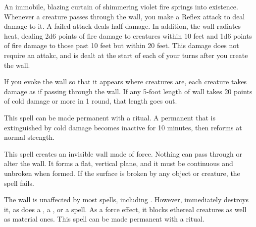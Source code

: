 \spellrng{\rngmed}
\spelldur{\durshort}
\begin{spelleffect}
  An immobile, blazing curtain of shimmering violet fire springs into existence. Whenever a creature passes through the wall, you make a Reflex attack to deal damage to it. A failed attack deals half damage. In addition, the wall radiates heat, dealing 2d6 points of fire damage to creatures within 10 feet and 1d6 points of fire damage to those past 10 feet but within 20 feet. This damage does not require an attakc, and is dealt at the start of each of your turns after you create the wall.
  \par If you evoke the wall so that it appears where creatures are, each creature takes damage as if passing through the wall. If any 5-foot length of wall takes 20 points of cold damage or more in 1 round, that length goes out.
\end{spelleffect}
\begin{spellnotes}
This spell can be made permanent with a  ritual. A permanent  that is extinguished by cold damage becomes inactive for 10 minutes, then reforms at normal strength.
\end{spellnotes}

\spellrng{\rngmed}
\begin{spelleffect}
  This spell creates an invisible wall made of force. Nothing can pass through or alter the wall. It forms a flat, vertical plane, and it must be continuous and unbroken when formed. If the surface is broken by any object or creature, the spell fails.
\end{spelleffect}
\begin{spellnotes}
  The wall is unaffected by most spells, including . However,  immediately destroys it, as does a , a , or a  spell. As a force effect, it blocks ethereal creatures as well as material ones.
This spell can be made permanent with a  ritual.
\end{spellnotes}

